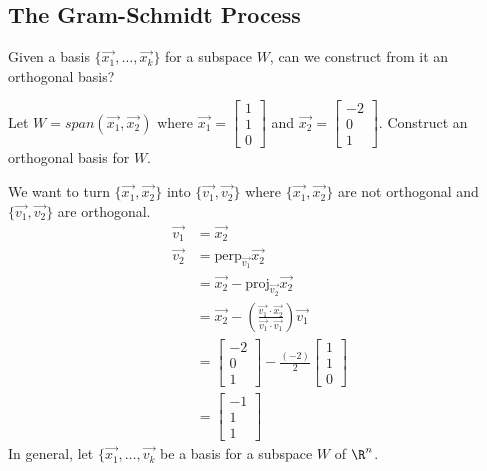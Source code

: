 \documentclass{math}
\begin{document}
\subsection*{The Gram-Schmidt Process}
Given a basis \( \{\vec{x_1},\dots,\vec{x_k}\} \) for a subspace \( W \), can we
construct from it an orthogonal basis? \par
Let \( W = span(\vec{x_1},\vec{x_2}) \) where \( \vec{x_1} = \begin{bmatrix}
1 \\ 1 \\ 0\end{bmatrix} \) and \( \vec{x_2} = \begin{bmatrix}-2 \\ 0 \\
1\end{bmatrix} \). Construct an orthogonal basis for \( W \). \par
We want to turn \( \{\vec{x_1},\vec{x_2}\} \) into \( \{\vec{v_1},\vec{v_2}\} \)
where \( \{\vec{x_1},\vec{x_2}\} \) are not orthogonal and
\( \{\vec{v_1},\vec{v_2}\} \) are orthogonal.
\begin{align*}
  \vec{v_1} &= \vec{x_2} \\
  \vec{v_2} &= \text{perp}_{\vec{v_1}}\vec{x_2} \\
  &= \vec{x_2}-\text{proj}_{\vec{v_2}}\vec{x_2} \\
  &= \vec{x_2}-\left(\frac{\vec{v_1}\cdot\vec{x_2}}{\vec{v_1}\cdot\vec{v_1}}
    \right)\vec{v_1} \\
  &= \begin{bmatrix}-2 \\ 0 \\ 1\end{bmatrix}-\frac{(-2)}{2}\begin{bmatrix}
    1 \\ 1 \\ 0\end{bmatrix} \\
  &= \begin{bmatrix}-1 \\ 1 \\ 1\end{bmatrix}
\end{align*}
In general, let \( \{\vec{x_1},\dots,\vec{v_k} \) be a basis for a subspace
\( W \) of \( \R^n \).
\end{document}
